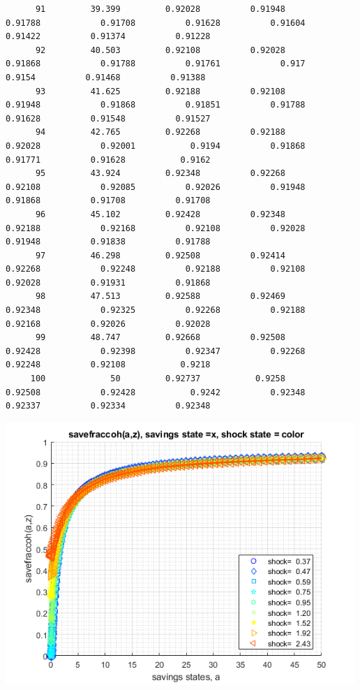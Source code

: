 \documentclass[
]{book}
\begin{document}
\begin{verbatim}
      91         39.399         0.92028          0.91948           0.91788            0.91708          0.91628          0.91604          0.91422          0.91374          0.91228   
      92         40.503         0.92108          0.92028           0.91868            0.91788          0.91761            0.917           0.9154          0.91468          0.91388   
      93         41.625         0.92188          0.92108           0.91948            0.91868          0.91851          0.91788          0.91628          0.91548          0.91527   
      94         42.765         0.92268          0.92188           0.92028            0.92001           0.9194          0.91868          0.91771          0.91628           0.9162   
      95         43.924         0.92348          0.92268           0.92108            0.92085          0.92026          0.91948          0.91868          0.91708          0.91708   
      96         45.102         0.92428          0.92348           0.92188            0.92168          0.92108          0.92028          0.91948          0.91838          0.91788   
      97         46.298         0.92508          0.92414           0.92268            0.92248          0.92188          0.92108          0.92028          0.91931          0.91868   
      98         47.513         0.92588          0.92469           0.92348            0.92325          0.92268          0.92188          0.92168          0.92026          0.92028   
      99         48.747         0.92668          0.92508           0.92428            0.92398          0.92347          0.92268          0.92248          0.92108           0.9218   
     100             50         0.92737           0.9258           0.92508            0.92428           0.9242          0.92348          0.92337          0.92334          0.92348   
\end{verbatim}

\includegraphics[width=5.20833in,height=\textheight]{img/fx_vfi_az_mzoom_loop_images/figure_2.png}
\end{document}
